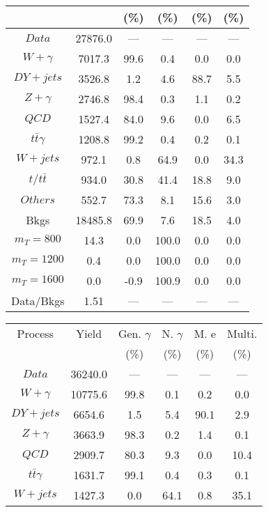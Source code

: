 \begin{figure}
\begin{minipage}[c]{0.32\textwidth}
{\begin{tabular}{cccccc}
 &  & (\%) & (\%) & (\%) & (\%)  \\
\hline
                                                                      $ Data $ &  27876.0 &  --- &  --- &  --- &  ---\\
$ W+\gamma $ &  7017.3 &  99.6 &  0.4 &  0.0 &  0.0\\
$ DY+jets $ &  3526.8 &  1.2 &  4.6 &  88.7 &  5.5\\
$ Z+\gamma $ &  2746.8 &  98.4 &  0.3 &  1.1 &  0.2\\
$ QCD $ &  1527.4 &  84.0 &  9.6 &  0.0 &  6.5\\
$ t\bar{t}\gamma $ &  1208.8 &  99.2 &  0.4 &  0.2 &  0.1\\
$ W+jets $ &  972.1 &  0.8 &  64.9 &  0.0 &  34.3\\
$ t/t\bar{t} $ &  934.0 &  30.8 &  41.4 &  18.8 &  9.0\\
$ Others $ &  552.7 &  73.3 &  8.1 &  15.6 &  3.0\\
Bkgs &  18485.8 &  69.9 &  7.6 &  18.5 &  4.0\\
$ m_{T} = 800 $ &  14.3 &  0.0 &  100.0 &  0.0 &  0.0\\
$ m_{T} = 1200 $ &  0.4 &  0.0 &  100.0 &  0.0 &  0.0\\
$ m_{T} = 1600 $ &  0.0 &  -0.9 &  100.9 &  0.0 &  0.0\\
Data/Bkgs &  1.51 &  --- &  --- &  --- &  ---\\
\hline
\end{tabular}
}
\end{minipage}
\begin{minipage}[c]{0.32\textwidth}
\centering
\tiny{
\begin{tabular}{cccccc}
\hline
Process & Yield & Gen. $\gamma$ & N. $\gamma$ & M. e & Multi. \\
 &  & (\%) & (\%) & (\%) & (\%)  \\
\hline
                                                                      $ Data $ &  36240.0 &  --- &  --- &  --- &  ---\\
$ W+\gamma $ &  10775.6 &  99.8 &  0.1 &  0.2 &  0.0\\
$ DY+jets $ &  6654.6 &  1.5 &  5.4 &  90.1 &  2.9\\
$ Z+\gamma $ &  3663.9 &  98.3 &  0.2 &  1.4 &  0.1\\
$ QCD $ &  2909.7 &  80.3 &  9.3 &  0.0 &  10.4\\
$ t\bar{t}\gamma $ &  1631.7 &  99.1 &  0.4 &  0.3 &  0.1\\
$ W+jets $ &  1427.3 &  0.0 &  64.1 &  0.8 &  35.1\\

\end{tabular}}
\end{minipage}
\end{figure}
